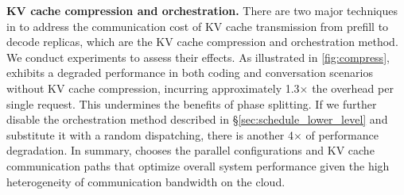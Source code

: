 
\begin{table}[!t]
\centering
\small
\caption{}
\label{tab:lr}
  \vspace{-2em}
\end{table}


\noindent \textbf{KV cache compression and orchestration.} 
There are two major techniques in \sys to address the communication cost of KV cache transmission from prefill to decode replicas, which are the KV cache compression and orchestration method. We conduct experiments to assess their effects. 
As illustrated in \autoref{fig:compress}, \sys exhibits a degraded performance in both coding and conversation scenarios without KV cache compression, incurring approximately 1.3$\times$ the overhead per single request. This undermines the benefits of phase splitting. If we further disable the orchestration method described in \S\ref{sec:schedule_lower_level} and substitute it with a random dispatching, there is another 4$\times$ of performance degradation. 
In summary, \sys chooses the parallel configurations and KV cache communication paths that optimize overall system performance given the high heterogeneity of communication bandwidth on the cloud.

